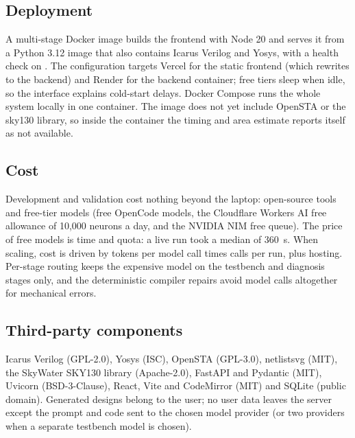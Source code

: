 \subsection{Deployment}
A multi-stage Docker image builds the frontend with Node 20 and serves it from a Python 3.12 image that also contains Icarus Verilog and Yosys, with a health check on . The configuration targets Vercel for the static frontend (which rewrites  to the backend) and Render for the backend container; free tiers sleep when idle, so the interface explains cold-start delays. Docker Compose runs the whole system locally in one container. The image does not yet include OpenSTA or the sky130 library, so inside the container the timing and area estimate reports itself as not available.

\subsection{Cost}
Development and validation cost nothing beyond the laptop: open-source tools and free-tier models (free OpenCode models, the Cloudflare Workers AI free allowance of 10,000 neurons a day, and the NVIDIA NIM free queue). The price of free models is time and quota: a live run took a median of 360~s. When scaling, cost is driven by tokens per model call times calls per run, plus hosting. Per-stage routing keeps the expensive model on the testbench and diagnosis stages only, and the deterministic compiler repairs avoid model calls altogether for mechanical errors.

\subsection{Third-party components}
Icarus Verilog (GPL-2.0), Yosys (ISC), OpenSTA (GPL-3.0), netlistsvg (MIT), the SkyWater SKY130 library (Apache-2.0), FastAPI and Pydantic (MIT), Uvicorn (BSD-3-Clause), React, Vite and CodeMirror (MIT) and SQLite (public domain). Generated designs belong to the user; no user data leaves the server except the prompt and code sent to the chosen model provider (or two providers when a separate testbench model is chosen).
